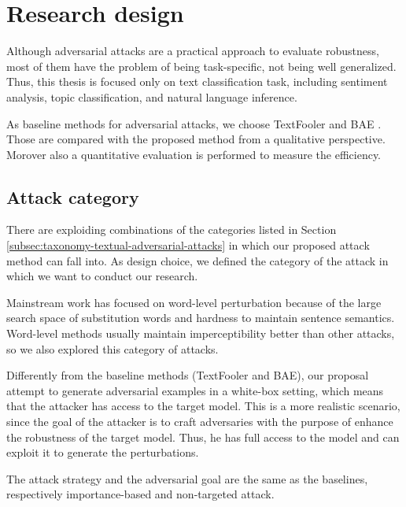 \section{Research design}\label{sec:research-design}

Although adversarial attacks are a practical approach to evaluate robustness, most of them have the problem of being task-specific, not being well generalized.
Thus, this thesis is focused only on text classification task, including sentiment analysis, topic classification, and natural language inference.

As baseline methods for adversarial attacks, we choose TextFooler \cite{journals/corr/abs-1907-11932} and BAE \cite{conf/emnlp/GargR20}.
Those are compared with the proposed method from a qualitative perspective. Morover also a quantitative evaluation is performed to measure the efficiency.

\subsection{Attack category}\label{subsec:attack-category}

There are exploiding combinations of the categories listed in Section \ref{subsec:taxonomy-textual-adversarial-attacks} in which our proposed attack method can fall into.
As design choice, we defined the category of the attack in which we want to conduct our research.

Mainstream work has focused on word-level perturbation because of the large search space of substitution words and hardness to maintain sentence semantics. 
Word-level methods usually maintain imperceptibility better than other attacks, so we also explored this category of attacks.

Differently from the baseline methods (TextFooler and BAE), our proposal attempt to generate adversarial examples in a white-box setting, which means that the attacker has access to the target model. 
This is a more realistic scenario, since the goal of the attacker is to craft adversaries with the purpose of enhance the robustness of the target model. 
Thus, he has full access to the model and can exploit it to generate the perturbations.

The attack strategy and the adversarial goal are the same as the baselines, respectively importance-based and non-targeted attack.

